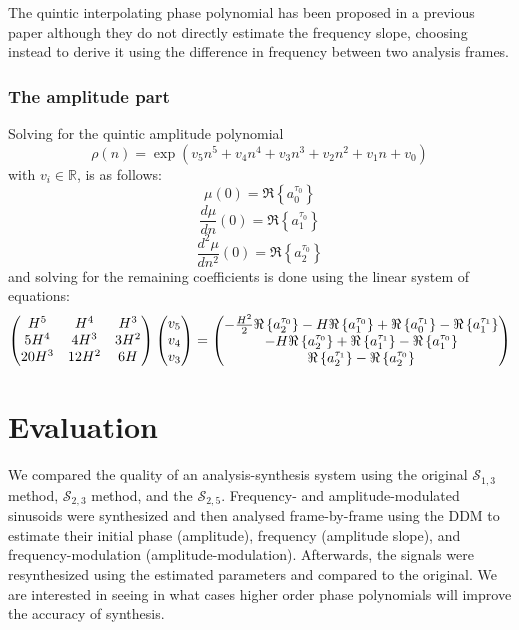 The quintic interpolating phase polynomial has been proposed in a previous paper
\cite{girin2003comparing} although they do not directly estimate the frequency
slope, choosing instead to derive it using the difference in frequency between
two analysis frames.

\subsubsection{The amplitude part}

Solving for the quintic amplitude polynomial
\begin{equation}
    \label{eq:quinticamppoly}
    \rho(n) = \exp \left(v_5 n^{5} + v_4 n^{4} + v_3 n^{3} + v_2 n^{2} + v_1 n + v_0 \right)
\end{equation}
with $v_i \in \mathbb{R}$, is as follows:
\[
    \mu(0) = \Re \left\{ a^{\tau_0}_0 \right\}
\]
\[
    \frac{d \mu}{d n}(0) = \Re \left\{ a^{\tau_0}_1 \right\}
\]
\[
    \frac{d^{2} \mu}{d n^{2}}(0) = \Re \left\{ a^{\tau_0}_2 \right\}
\]
and solving for the remaining coefficients is done using the linear system of
equations:
\begin{equation}
    \begin{pmatrix}
        H^5 & H^4 & H^3 \\
        5 H^4 & 4 H^3 & 3 H^2 \\
        20 H^3 & 12 H^2 & 6 H
    \end{pmatrix}
    \begin{pmatrix}
        v_5 \\
        v_4 \\
        v_3
    \end{pmatrix}
    =
    \begin{pmatrix}
        -\frac{ H^{2} }{2} \Re \left\{  a^{\tau_0}_2  \right\} - H \Re \left\{  a^{\tau_0}_1  \right\} +
            \Re \left\{  a^{\tau_1}_0  \right\} - \Re \left\{  a^{\tau_1}_1  \right\} \\
        -H \Re \left\{  a^{\tau_0}_2  \right\} + \Re \left\{  a^{\tau_1}_1  \right\} - \Re \left\{  a^{\tau_0}_1  \right\} \\
        \Re \left\{  a^{\tau_1}_2  \right\} - \Re \left\{  a^{\tau_0}_2  \right\}
    \end{pmatrix}
\end{equation}

\section{Evaluation}

We compared the quality of an analysis-synthesis system using the original
$\mathscr{S}_{1,3}$ method, $\mathscr{S}_{2,3}$ method, and the
$\mathscr{S}_{2,5}$. Frequency- and amplitude-modulated sinusoids were
synthesized and then analysed frame-by-frame using the DDM to estimate their
initial phase (amplitude), frequency (amplitude slope), and frequency-modulation
(amplitude-modulation). Afterwards, the signals were resynthesized using the
estimated parameters and compared to the original.  We are interested in seeing
in what cases higher order phase polynomials will improve the accuracy of
synthesis.

